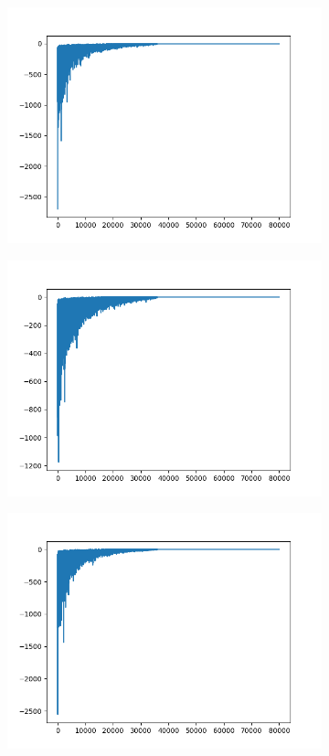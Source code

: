 \begin{figure}[H]
	\begin{subfigure}{.25\textwidth}
		\includegraphics[width=\textwidth]{img/train/matrice_8-11_29_37.png}
	\end{subfigure}%
	\begin{subfigure}{.25\textwidth}
		\includegraphics[width=\textwidth]{img/train/matrice_9-11_31_10.png}
	\end{subfigure}%
	\begin{subfigure}{.25\textwidth}
		\includegraphics[width=\textwidth]{img/train/matrice_10-11_33_11.png}

\end{subfigure}
\end{figure}
